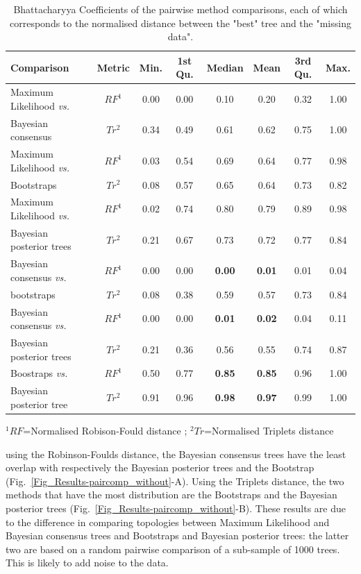 \documentclass[12pt,letterpaper]{article}
\begin{document}
\begin{table}[ht]
\caption{Bhattacharyya Coefficients of the pairwise method comparisons, each of which corresponds to the normalised distance between the "best" tree and the "missing data".}
\centering
\begin{tabular}{lccccccc}
  \hline
 Comparison &  Metric & Min. & 1st Qu. & Median & Mean & 3rd Qu. & Max. \\ 
  \hline
    Maximum Likelihood \textit{vs.} & $RF^1$ & 0.00 & 0.00 & 0.10 & 0.20 & 0.32 & 1.00 \\ 
    Bayesian consensus              & $Tr^2$ & 0.34 & 0.49 & 0.61 & 0.62 & 0.75 & 1.00 \\ 
    Maximum Likelihood \textit{vs.} & $RF^1$ & 0.03 & 0.54 & 0.69 & 0.64 & 0.77 & 0.98 \\ 
    Bootstraps                      & $Tr^2$ & 0.08 & 0.57 & 0.65 & 0.64 & 0.73 & 0.82 \\ 
    Maximum Likelihood \textit{vs.} & $RF^1$ & 0.02 & 0.74 & 0.80 & 0.79 & 0.89 & 0.98 \\ 
    Bayesian posterior trees        & $Tr^2$ & 0.21 & 0.67 & 0.73 & 0.72 & 0.77 & 0.84 \\ 
    Bayesian consensus \textit{vs.} & $RF^1$ & 0.00 & 0.00 & \textbf{0.00} & \textbf{0.01} & 0.01 & 0.04 \\ 
    bootstraps                      & $Tr^2$ & 0.08 & 0.38 & 0.59 & 0.57 & 0.73 & 0.84 \\ 
    Bayesian consensus \textit{vs.} & $RF^1$ & 0.00 & 0.00 & \textbf{0.01} & \textbf{0.02} & 0.04 & 0.11 \\ 
    Bayesian posterior trees        & $Tr^2$ & 0.21 & 0.36 & 0.56 & 0.55 & 0.74 & 0.87 \\ 
    Boostraps \textit{vs.}          & $RF^1$ & 0.50 & 0.77 & \textbf{0.85} & \textbf{0.85} & 0.96 & 1.00 \\ 
    Bayesian posterior tree         & $Tr^2$ & 0.91 & 0.96 & \textbf{0.98} & \textbf{0.97} & 0.99 & 1.00 \\ 
   \hline
\end{tabular}
   $^1RF$=Normalised Robison-Fould distance ; $^2Tr$=Normalised Triplets distance
\label{Tab_Results-Difference_methods}
\end{table}

using the Robinson-Foulds distance, the Bayesian consensus trees have the least overlap with respectively the Bayesian posterior trees and the Bootstrap (Fig.~\ref{Fig_Results-paircomp_without}-A). Using the Triplets distance, the two methods that have the most distribution %
are the Bootstraps and the Bayesian posterior trees (Fig.~\ref{Fig_Results-paircomp_without}-B). These results are due to the difference in comparing topologies between Maximum Likelihood and Bayesian consensus trees and Bootstraps and Bayesian posterior trees: the latter two are based on a random pairwise comparison of a sub-sample of 1000 trees. This is likely to add noise to the data.
\end{document}
